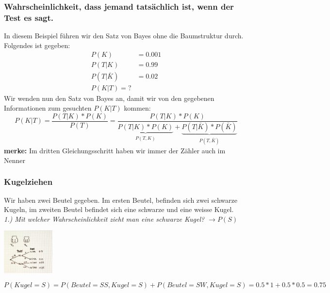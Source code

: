 \documentclass[a4paper]{article}
\newenvironment{Figure}
	{\par\medskip\noindent\minipage{\linewidth}}
	{\endminipage\par\medskip}
\theoremstyle{definition}
\theoremstyle{example}
\begin{document}
\subsubsection{Wahrscheinlichkeit, dass jemand tatsächlich ist, wenn der Test es sagt.}
In diesem Beispiel führen wir den Satz von Bayes ohne die Baumstruktur durch.\\
Folgendes ist gegeben:\\
\begin{equation}
\begin{split}
	P(K) &= 0.001 \\
	P(T | K) &= 0.99 \\
	P(T | \bar{K}) &= 0.02 \\
	P(K | T) = ?
\end{split}
\end{equation}
Wir wenden nun den Satz von Bayes an, damit wir von den gegebenen Informationen zum gesuchten $P( K | T)$ kommen:
\begin{equation}
	P(K|T) = \frac{P(T|K) * P(K)}{P(T)} = \frac{P(T|K) * P(K)}{\underbrace{P(T|K) * P(K)}_{\substack{P(T,K)}} + \underbrace{P(T|\bar{K}) * P(\bar{K})}_{\substack{P(T,\bar{K})}}}
\end{equation}
\textbf{merke: } Im dritten Gleichungsschritt haben wir immer der Zähler auch im Nenner

\subsubsection{Kugelziehen}
Wir haben zwei Beutel gegeben. Im ersten Beutel, befinden sich zwei schwarze Kugeln, im zweiten Beutel befindet sich eine schwarze und eine weisse Kugel.\\
\textit{1.) Mit welcher Wahrscheinlichkeit zieht man eine schwarze Kugel? $\rightarrow P(S)$}

\begin{Figure}
	\centering
	\includegraphics[width=100px]{img/SS_SW_Kugelziehen.jpg}
	\label{fig:Wsk schwarze Kugel gezogen}
\end{Figure}

\begin{equation}
 P(Kugel = S) = P(Beutel = SS, Kugel = S) + P(Beutel = SW, Kugel=S) = 0.5*1+0.5*0.5 = 0.75
\end{equation}
\end{document}
